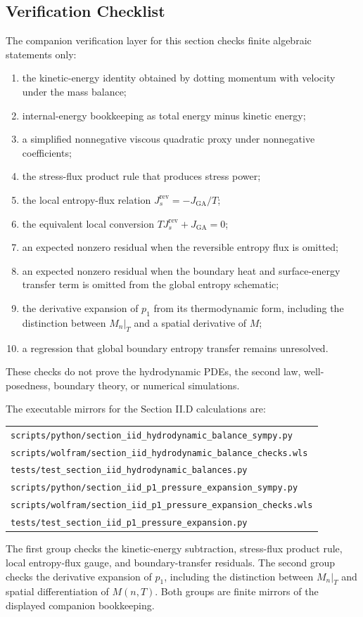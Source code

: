 \subsection{Verification Checklist}

The companion verification layer for this section checks finite algebraic
statements only:
\begin{enumerate}
\item the kinetic-energy identity obtained by dotting momentum with velocity
  under the mass balance;
\item internal-energy bookkeeping as total energy minus kinetic energy;
\item a simplified nonnegative viscous quadratic proxy under nonnegative
  coefficients;
\item the stress-flux product rule that produces stress power;
\item the local entropy-flux relation \(J_s^{\mathrm{rev}}=-J_{\mathrm{GA}}/T\);
\item the equivalent local conversion \(T J_s^{\mathrm{rev}}+J_{\mathrm{GA}}=0\);
\item an expected nonzero residual when the reversible entropy flux is
  omitted;
\item an expected nonzero residual when the boundary heat and surface-energy
  transfer term is omitted from the global entropy schematic;
\item the derivative expansion of \(p_1\) from its thermodynamic form, including
  the distinction between \(M_n|_T\) and a spatial derivative of \(M\);
\item a regression that global boundary entropy transfer remains unresolved.
\end{enumerate}
These checks do not prove the hydrodynamic PDEs, the second law,
well-posedness, boundary theory, or numerical simulations.

The executable mirrors for the Section II.D calculations are:
\begin{center}
\small
\begin{tabular}{@{}l@{}}
\texttt{scripts/python/section\_iid\_hydrodynamic\_balance\_sympy.py}\\
\texttt{scripts/wolfram/section\_iid\_hydrodynamic\_balance\_checks.wls}\\
\texttt{tests/test\_section\_iid\_hydrodynamic\_balances.py}\\
\texttt{scripts/python/section\_iid\_p1\_pressure\_expansion\_sympy.py}\\
\texttt{scripts/wolfram/section\_iid\_p1\_pressure\_expansion\_checks.wls}\\
\texttt{tests/test\_section\_iid\_p1\_pressure\_expansion.py}
\end{tabular}
\end{center}
The first group checks the kinetic-energy subtraction, stress-flux product
rule, local entropy-flux gauge, and boundary-transfer residuals.  The second
group checks the derivative expansion of \(p_1\), including the distinction
between \(M_n|_T\) and spatial differentiation of \(M(n,T)\).  Both groups
are finite mirrors of the displayed companion bookkeeping.

